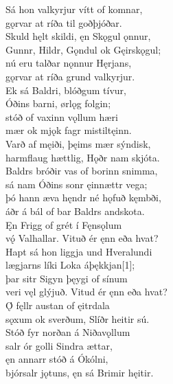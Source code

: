 \bva Sá hon valkyrjur \hld vítt of komnar, \\%
gǫrvar at ríða \hld til goðþjóðar. \\%
Skuld hęlt skildi, \hld ęn Skǫgul ǫnnur, \\%
Gunnr, Hildr, Gǫndul \hld ok Gęirskǫgul; \\%
nú eru talðar \hld nǫnnur Hęrjans, \\%
gǫrvar at ríða \hld grund valkyrjur.\\%

\bva Ek sá Baldri, \hld blóðgum tívur, \\%
Óðins barni, \hld ørlǫg folgin; \\%
stóð of vaxinn \hld vǫllum hæri \\%
mær ok mjǫk fagr \hld mistiltęinn.\\%

\bva Varð af męiði, \hld þęims mær sýndisk, \\%
harmflaug hættlig, \hld Hǫðr nam skjóta. \\%
Baldrs bróðir vas \hld of borinn snimma, \\%
sá nam Óðins sonr \hld ęinnættr vega;\\%

\bva þó hann æva hęndr \hld né hǫfuð kęmbði, \\%
áðr á bál of bar \hld Baldrs andskota. \\%
Ęn Frigg of grét \hld í Fęnsǫlum \\%
vǫ́ Valhallar. \hld Vituð ér ęnn eða hvat?\\%

\bva Hapt sá hon liggja \hld und Hveralundi \\%
lægjarns líki \hld Loka áþękkjan[1]; \\%
þar sitr Sigyn \hld þęygi of sínum \\%
veri vęl glýjuð. \hld Vitud ér ęnn eða hvat?\\%

\bva Ǫ́ fęllr austan \hld of ęitrdala \\%
sǫxum ok sverðum, \hld Slíðr heitir sú.\\%

\bva Stóð fyr norðan \hld á Niðavǫllum \\%
salr ór golli \hld Sindra ættar, \\%
ęn annarr stóð \hld á Ókólni, \\%
bjórsalr jǫtuns, \hld ęn sá Brimir hęitir.\\%

